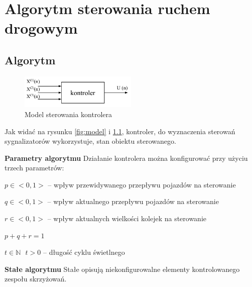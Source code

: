 \chapter{Algorytm sterowania ruchem drogowym}
\section{Algorytm}
\begin{figure}[h]
    \centering
    \includegraphics[width=0.5\textwidth]{images/kontroler.pdf}
    \caption{Model sterowania kontrolera}
    \label{fig:kontroler}
\end{figure}

Jak widać na rysunku \ref{fig:model} i \ref{fig:kontroler}, kontroler, do wyznaczenia sterowań sygnalizatorów wykorzystuje, stan obiektu sterowanego.

\vspace{1.5cm}
\textbf{Parametry algorytmu}
Działanie kontrolera można konfigurować przy użyciu trzech parametrów:
\vspace{0.5cm}

\begin{math} p \in <0, 1> \end{math} \textrm{ -- wpływ przewidywanego przepływu pojazdów na sterowanie}

\begin{math} q \in <0, 1> \end{math} \textrm{ -- wpływ aktualnego przepływu pojazdów na sterowanie}

\begin{math} r \in <0, 1> \end{math} \textrm{ -- wpływ aktualnych wielkości kolejek na sterowanie}

\begin{math} p + q + r = 1 \end{math}

\begin{math} t \in \mathbb{N} \textrm{ } t > 0 \end{math} \textrm{ -- długość cyklu świetlnego}

\vspace{1.5cm}
\textbf{Stałe algorytmu}
Stałe opisują niekonfigurowalne elementy kontrolowanego zespołu skrzyżowań.
\vspace{0.5cm}

